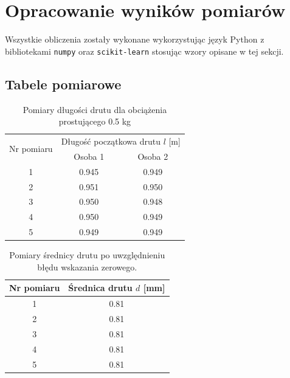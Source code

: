 \documentclass[a4paper,12pt]{article}
\begin{document}
\label{sec:opracowanie_wynikow}
\section{Opracowanie wyników pomiarów}

Wszystkie obliczenia zostały wykonane wykorzystując język Python z bibliotekami \texttt{numpy} oraz \texttt{scikit-learn} stosując wzory opisane w tej sekcji.
\subsection{Tabele pomiarowe}

\begin{table}[H]
    \centering
    \begin{tabular}{|c|c|c|}
        \hline
        \multirow{2}{*}{Nr pomiaru} & \multicolumn{2}{c|}{Długość początkowa drutu $l$ [m]} \\
        \cline{2-3}
        & Osoba 1 & Osoba 2 \\
        \hline
        1  & 0.945 & 0.949 \\ \hline
        2  & 0.951 & 0.950 \\ \hline
        3  & 0.950 & 0.948 \\ \hline
        4  & 0.950 & 0.949 \\ \hline
        5  & 0.949 & 0.949 \\ \hline
    \end{tabular}
    \caption{Pomiary długości drutu dla obciążenia prostującego 0.5 kg}
    \label{tab:wire_len}
\end{table}


\begin{table}[H]
    \centering
    \begin{tabular}{|c|c|}
        \hline
        Nr pomiaru & Średnica drutu $d$ [mm] \\
        \hline
        1 & 0.81 \\ \hline
        2 & 0.81 \\ \hline
        3 & 0.81 \\ \hline
        4 & 0.81 \\ \hline
        5 & 0.81 \\ \hline
    \end{tabular}
    \caption{Pomiary średnicy drutu po uwzględnieniu błędu wskazania zerowego.}
    \label{tab:srednica_drutu}
\end{table}
\end{document}
